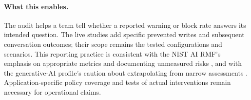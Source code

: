 \paragraph{What this enables.}
The audit helps a team tell whether a reported warning or block rate answers its intended question. The live studies add specific prevented writes and subsequent conversation outcomes; their scope remains the tested configurations and scenarios. This reporting practice is consistent with the NIST AI RMF's emphasis on appropriate metrics and documenting unmeasured risks \citep{nist2023rmf}, and with the generative-AI profile's caution about extrapolating from narrow assessments \citep{nist2024genai}. Application-specific policy coverage and tests of actual interventions remain necessary for operational claims.
